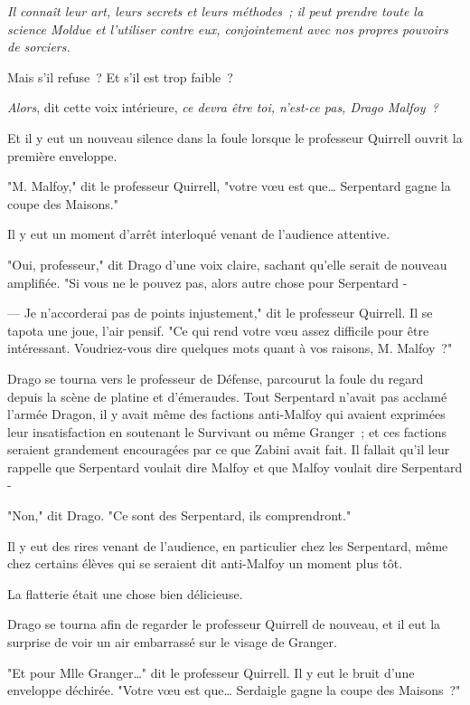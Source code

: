 \emph{Il connaît leur art, leurs secrets et leurs méthodes~; il peut prendre toute la science Moldue et l'utiliser contre eux, conjointement avec nos propres pouvoirs de sorciers.}

Mais s'il refuse~? Et s'il est trop faible~?

\emph{Alors}, dit cette voix intérieure, \emph{ce devra être toi, n'est-ce pas, Drago Malfoy~?}

Et il y eut un nouveau silence dans la foule lorsque le professeur Quirrell ouvrit la première enveloppe.

"M. Malfoy," dit le professeur Quirrell, "votre vœu est que… Serpentard gagne la coupe des Maisons."

Il y eut un moment d'arrêt interloqué venant de l'audience attentive.

"Oui, professeur," dit Drago d'une voix claire, sachant qu'elle serait de nouveau amplifiée. "Si vous ne le pouvez pas, alors autre chose pour Serpentard -

--- Je n'accorderai pas de points injustement," dit le professeur Quirrell. Il se tapota une joue, l'air pensif. "Ce qui rend votre vœu assez difficile pour être intéressant. Voudriez-vous dire quelques mots quant à vos raisons, M. Malfoy~?"

Drago se tourna vers le professeur de Défense, parcourut la foule du regard depuis la scène de platine et d'émeraudes. Tout Serpentard n'avait pas acclamé l'armée Dragon, il y avait même des factions anti-Malfoy qui avaient exprimées leur insatisfaction en soutenant le Survivant ou même Granger~; et ces factions seraient grandement encouragées par ce que Zabini avait fait. Il fallait qu'il leur rappelle que Serpentard voulait dire Malfoy et que Malfoy voulait dire Serpentard -

"Non," dit Drago. "Ce sont des Serpentard, ils comprendront."

Il y eut des rires venant de l'audience, en particulier chez les Serpentard, même chez certains élèves qui se seraient dit anti-Malfoy un moment plus tôt.

La flatterie était une chose bien délicieuse.

Drago se tourna afin de regarder le professeur Quirrell de nouveau, et il eut la surprise de voir un air embarrassé sur le visage de Granger.

"Et pour Mlle Granger…" dit le professeur Quirrell. Il y eut le bruit d'une enveloppe déchirée. "Votre vœu est que… Serdaigle gagne la coupe des Maisons~?"

